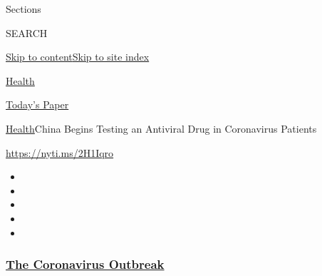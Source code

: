 Sections

SEARCH

\protect\hyperlink{site-content}{Skip to
content}\protect\hyperlink{site-index}{Skip to site index}

\href{https://www.nytimes3xbfgragh.onion/section/health}{Health}

\href{https://myaccount.nytimes3xbfgragh.onion/auth/login?response_type=cookie\&client_id=vi}{}

\href{https://www.nytimes3xbfgragh.onion/section/todayspaper}{Today's
Paper}

\href{/section/health}{Health}\textbar{}China Begins Testing an
Antiviral Drug in Coronavirus Patients

\url{https://nyti.ms/2H1Iqro}

\begin{itemize}
\item
\item
\item
\item
\item
\end{itemize}

\hypertarget{the-coronavirus-outbreak}{%
\subsubsection{\texorpdfstring{\href{https://www.nytimes3xbfgragh.onion/news-event/coronavirus?name=styln-coronavirus-national\&region=TOP_BANNER\&block=storyline_menu_recirc\&action=click\&pgtype=Article\&impression_id=49b7f600-f4cc-11ea-ba51-959d423cf41a\&variant=undefined}{The
Coronavirus
Outbreak}}{The Coronavirus Outbreak}}\label{the-coronavirus-outbreak}}

